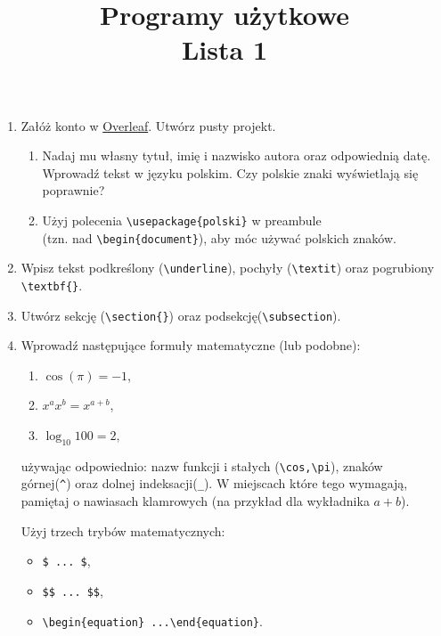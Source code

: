 \documentclass[12pt, letterpaper]{article}
\title{Programy użytkowe \\ Lista 1}
\author{ }
\date{}
\begin{document}
\maketitle

\begin{enumerate}
    \item Załóż konto w \href{https://www.overleaf.com/project}{Overleaf}. Utwórz pusty projekt.
    \begin{enumerate}
        \item Nadaj mu własny tytuł, imię i nazwisko autora oraz odpowiednią datę. Wprowadź tekst w języku polskim. Czy polskie znaki wyświetlają się poprawnie?
        \item Użyj polecenia \verb|\usepackage{polski}| w preambule  \\(tzn. nad 
        \verb|\begin{document}|), aby móc używać polskich znaków.
    \end{enumerate}
    \item Wpisz tekst podkreślony (\verb|\underline|{}), pochyły (\verb|\textit|{}) oraz pogrubiony \verb|\textbf{}|.
    \item Utwórz sekcję (\verb|\section{}|) oraz podsekcję(\verb|\subsection|).
    \item Wprowadź następujące formuły matematyczne (lub podobne):
    \begin{enumerate}
        \item $\cos(\pi)=-1$,
        \item $x^ax^b=x^{a+b}$,
        \item $\log_{10} 100=2,$
    \end{enumerate}
    używając odpowiednio: nazw funkcji i stałych (\verb|\cos,\pi|), znaków \\górnej(\verb|^|) oraz dolnej indeksacji(\verb|_|). W miejscach które tego wymagają, pamiętaj o nawiasach klamrowych (na przykład dla wykładnika $a+b$).
    
Użyj trzech trybów matematycznych:  \begin{itemize}
    \item \verb|$ ... $|,
    \item  \verb|$$ ... $$|,
    \item \verb|\begin{equation} ...\end{equation}|. 
\end{itemize}


\end{enumerate}
\end{document}
